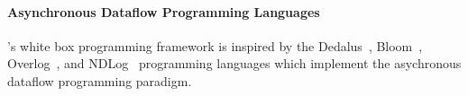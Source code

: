 \paragraph{Asynchronous Dataflow Programming Languages}
\fluent{}'s white box programming framework is inspired by the
Dedalus~\cite{alvaro2011dedalus}, Bloom~\cite{alvaro2011consistency,
conway2012logic}, Overlog~\cite{loo2005implementing}, and
NDLog~\cite{loo2009declarative} programming languages which implement the
asychronous dataflow programming paradigm.
